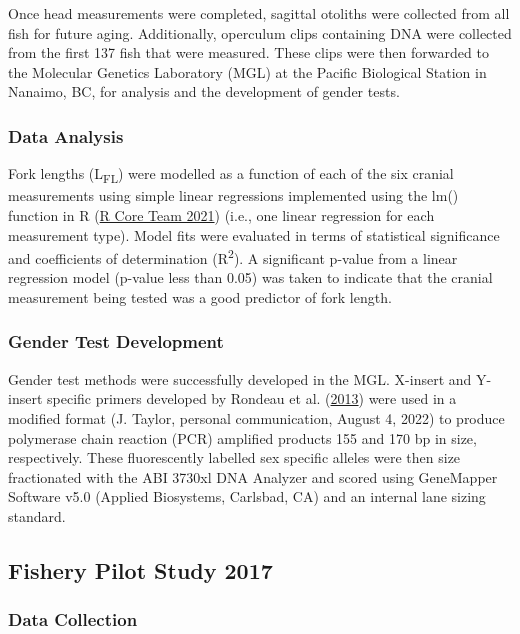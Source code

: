 \documentclass[12pt]{article}\usepackage[]{graphicx}\usepackage[]{color}
\begin{document}
Once head measurements were completed, sagittal otoliths were collected from all fish for future aging. Additionally, operculum clips containing DNA were collected from the first 137 fish that were measured. These clips were then forwarded to the Molecular Genetics Laboratory (MGL) at the Pacific Biological Station in Nanaimo, BC, for analysis and the development of gender tests.

\hypertarget{data-analysis}{%
\subsubsection{Data Analysis}\label{data-analysis}}

Fork lengths (L\textsubscript{FL}) were modelled as a function of each of the six cranial measurements using simple linear regressions implemented using the lm() function in R (\protect\hyperlink{ref-R}{R Core Team 2021}) (i.e., one linear regression for each measurement type). Model fits were evaluated in terms of statistical significance and coefficients of determination (R\textsuperscript{2}). A significant p-value from a linear regression model (p-value less than 0.05) was taken to indicate that the cranial measurement being tested was a good predictor of fork length.

\hypertarget{gender-test-development}{%
\subsubsection{Gender Test Development}\label{gender-test-development}}

Gender test methods were successfully developed in the MGL. X-insert and Y-insert specific primers developed by Rondeau et al. (\protect\hyperlink{ref-Rondeau2013}{2013}) were used in a modified format (J. Taylor, personal communication, August 4, 2022) to produce polymerase chain reaction (PCR) amplified products 155 and 170 bp in size, respectively. These fluorescently labelled sex specific alleles were then size fractionated with the ABI 3730xl DNA Analyzer and scored using GeneMapper Software v5.0 (Applied Biosystems, Carlsbad, CA) and an internal lane sizing standard.

\hypertarget{fishery-pilot-study-2017}{%
\subsection{Fishery Pilot Study 2017}\label{fishery-pilot-study-2017}}

\hypertarget{data-collection-1}{%
\subsubsection{Data Collection}\label{data-collection-1}}
\end{document}
